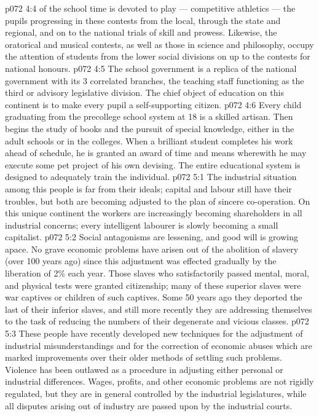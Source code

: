 \vs p072 4:4  of the school time is devoted to play --- competitive athletics --- the pupils progressing in these contests from the local, through the state and regional, and on to the national trials of skill and prowess. Likewise, the oratorical and musical contests, as well as those in science and philosophy, occupy the attention of students from the lower social divisions on up to the contests for national honours.
\vs p072 4:5 The school government is a replica of the national government with its 3 correlated branches, the teaching staff functioning as the third or advisory legislative division. The chief object of education on this continent is to make every pupil a self\hyp{}supporting citizen.
\vs p072 4:6 Every child graduating from the precollege school system at 18 is a skilled artisan. Then begins the study of books and the pursuit of special knowledge, either in the adult schools or in the colleges. When a brilliant student completes his work ahead of schedule, he is granted an award of time and means wherewith he may execute some pet project of his own devising. The entire educational system is designed to adequately train the individual.
\vs p072 5:1 The industrial situation among this people is far from their ideals; capital and labour still have their troubles, but both are becoming adjusted to the plan of sincere co\hyp{}operation. On this unique continent the workers are increasingly becoming shareholders in all industrial concerns; every intelligent labourer is slowly becoming a small capitalist.
\vs p072 5:2 Social antagonisms are lessening, and good will is growing apace. No grave economic problems have arisen out of the abolition of slavery (over 100 years ago) since this adjustment was effected gradually by the liberation of 2\% each year. Those slaves who satisfactorily passed mental, moral, and physical tests were granted citizenship; many of these superior slaves were war captives or children of such captives. Some 50 years ago they deported the last of their inferior slaves, and still more recently they are addressing themselves to the task of reducing the numbers of their degenerate and vicious classes.
\vs p072 5:3 \pc These people have recently developed new techniques for the adjustment of industrial misunderstandings and for the correction of economic abuses which are marked improvements over their older methods of settling such problems. Violence has been outlawed as a procedure in adjusting either personal or industrial differences. Wages, profits, and other economic problems are not rigidly regulated, but they are in general controlled by the industrial legislatures, while all disputes arising out of industry are passed upon by the industrial courts.
